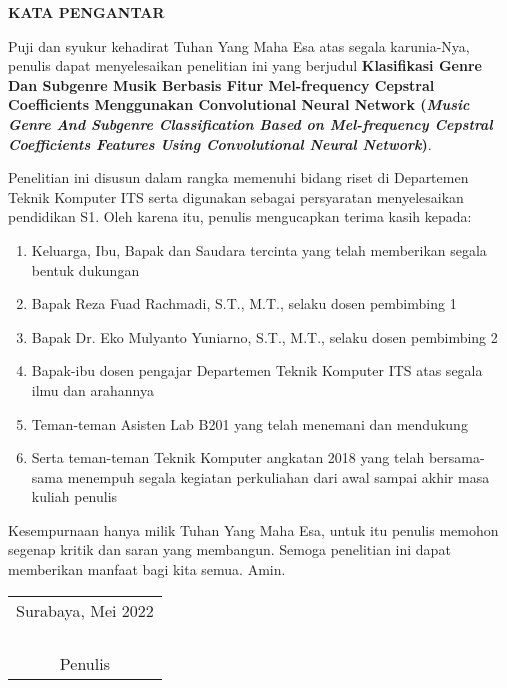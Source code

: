 \begin{center}
  \Large
  \textbf{KATA PENGANTAR}
\end{center}


\vspace{2ex}


Puji dan syukur kehadirat Tuhan Yang Maha Esa atas segala karunia-Nya, penulis dapat menyelesaikan penelitian ini yang berjudul \textbf{Klasifikasi Genre Dan Subgenre Musik Berbasis Fitur Mel-frequency Cepstral Coefficients Menggunakan Convolutional Neural Network (\emph{Music Genre And Subgenre Classification Based on Mel-frequency Cepstral Coefficients Features Using Convolutional Neural Network})}.

 Penelitian ini disusun dalam rangka memenuhi bidang riset di Departemen Teknik Komputer ITS serta digunakan sebagai persyaratan menyelesaikan pendidikan S1. Oleh karena itu, penulis mengucapkan terima kasih kepada:

\begin{enumerate}[nolistsep]

  \item Keluarga, Ibu, Bapak dan Saudara tercinta yang telah memberikan segala bentuk dukungan

  \item Bapak Reza Fuad Rachmadi, S.T., M.T., selaku dosen pembimbing 1

   \item Bapak Dr. Eko Mulyanto Yuniarno, S.T., M.T., selaku dosen pembimbing 2
   
   \item Bapak-ibu dosen pengajar Departemen Teknik Komputer ITS atas segala ilmu dan arahannya
   
   \item Teman-teman Asisten Lab B201 yang telah menemani dan mendukung
   
   \item Serta teman-teman Teknik Komputer angkatan 2018 yang telah bersama-sama menempuh segala kegiatan perkuliahan dari awal sampai akhir masa kuliah penulis

\end{enumerate}

Kesempurnaan hanya milik Tuhan Yang Maha Esa, untuk itu
penulis memohon segenap kritik dan saran yang membangun. Semoga penelitian ini dapat memberikan manfaat bagi kita semua.
Amin.

\begin{flushright}
  \begin{tabular}[b]{c}
    Surabaya, Mei 2022\\
    \\
    \\
    \\
    \\
    Penulis
  \end{tabular}
\end{flushright}
